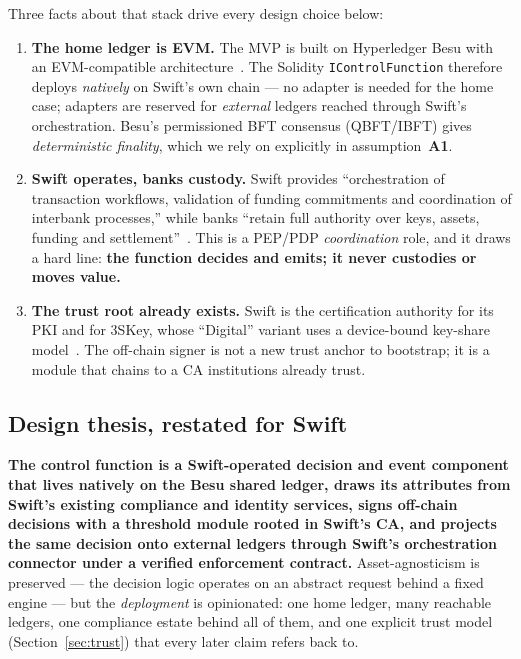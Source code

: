 \documentclass[11pt,a4paper]{article}
\newcommand{\Aref}[1]{\textbf{A#1}}
\begin{document}
Three facts about that stack drive every design choice below:
\begin{enumerate}[leftmargin=1.5em,itemsep=2pt]
  \item \textbf{The home ledger is EVM.} The MVP is built on Hyperledger Besu
  with an EVM-compatible architecture~\cite{swiftmvp}. The Solidity
  \texttt{IControlFunction} therefore deploys \emph{natively} on Swift's own
  chain --- no adapter is needed for the home case; adapters are reserved for
  \emph{external} ledgers reached through Swift's orchestration. Besu's
  permissioned BFT consensus (QBFT/IBFT) gives \emph{deterministic finality},
  which we rely on explicitly in assumption~\Aref{1}.
  \item \textbf{Swift operates, banks custody.} Swift provides ``orchestration of
  transaction workflows, validation of funding commitments and coordination of
  interbank processes,'' while banks ``retain full authority over keys, assets,
  funding and settlement''~\cite{swiftmvp}. This is a PEP/PDP \emph{coordination}
  role, and it draws a hard line: \textbf{the function decides and emits; it
  never custodies or moves value.}
  \item \textbf{The trust root already exists.} Swift is the certification
  authority for its PKI and for 3SKey, whose ``Digital'' variant uses a
  device-bound key-share model~\cite{swift3skey,swiftpki,swift3skeyfs}. The
  off-chain signer is not a new trust anchor to bootstrap; it is a module that
  chains to a CA institutions already trust.
\end{enumerate}

\subsection{Design thesis, restated for Swift}
\textbf{The control function is a Swift-operated decision and event component
that lives natively on the Besu shared ledger, draws its attributes from Swift's
existing compliance and identity services, signs off-chain decisions with a
threshold module rooted in Swift's CA, and projects the same decision onto
external ledgers through Swift's orchestration connector under a verified
enforcement contract.} Asset-agnosticism is preserved --- the decision logic
operates on an abstract request behind a fixed engine --- but the
\emph{deployment} is opinionated: one home ledger, many reachable ledgers, one
compliance estate behind all of them, and one explicit trust model
(Section~\ref{sec:trust}) that every later claim refers back to.
\end{document}

